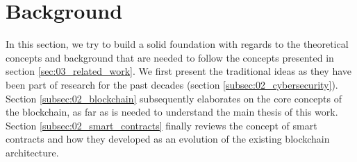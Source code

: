 \section{Background}
\label{sec:02_background}

In this section, we try to build a solid foundation with regards to the theoretical concepts and background that are needed to follow the concepts presented in section \ref{sec:03_related_work}. We first present the traditional ideas as they have been part of research for the past decades (section \ref{subsec:02_cybersecurity}). Section \ref{subsec:02_blockchain} subsequently elaborates on the core concepts of the blockchain, as far as is needed to understand the main thesis of this work. Section \ref{subsec:02_smart_contracts} finally reviews the concept of smart contracts and how they developed as an evolution of the existing blockchain architecture.




